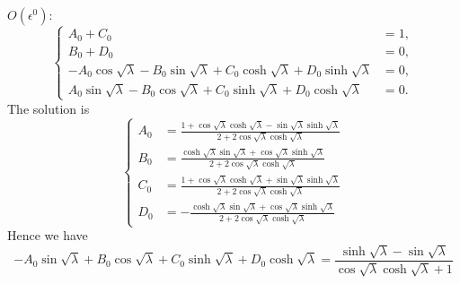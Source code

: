 \documentclass{article}
\begin{document}
\noindent
$O(\epsilon^0)$:
\begin{equation}
    \left\{\begin{aligned}
        A_0 + C_0 &= 1, \\
        B_0 + D_0 &= 0, \\
        - A_0 \cos{\sqrt{\lambda}} - B_0 \sin{\sqrt{\lambda}} + C_0 \cosh{\sqrt{\lambda}} + D_0 \sinh{\sqrt{\lambda}} &= 0, \\
        A_0 \sin{\sqrt{\lambda}} - B_0 \cos{\sqrt{\lambda}} + C_0 \sinh{\sqrt{\lambda}} + D_0 \cosh{\sqrt{\lambda}} &= 0.
    \end{aligned}\right.
\end{equation}
The solution is
\begin{equation}
    \left\{\begin{aligned}
        A_0 &= \frac{1 + \cos\sqrt{\lambda} \cosh\sqrt{\lambda} - \sin\sqrt{\lambda} \sinh\sqrt{\lambda} }{2 + 2 \cos\sqrt{\lambda} \cosh\sqrt{\lambda} } \\
        B_0 &= \frac{\cosh\sqrt{\lambda} \sin\sqrt{\lambda} + \cos\sqrt{\lambda} \sinh\sqrt{\lambda} }{2 + 2 \cos\sqrt{\lambda} \cosh\sqrt{\lambda} } \\
        C_0 &= \frac{1 + \cos\sqrt{\lambda} \cosh\sqrt{\lambda} + \sin\sqrt{\lambda} \sinh\sqrt{\lambda} }{2 + 2 \cos\sqrt{\lambda} \cosh\sqrt{\lambda} } \\
        D_0 &= -\frac{\cosh\sqrt{\lambda} \sin\sqrt{\lambda} + \cos\sqrt{\lambda} \sinh\sqrt{\lambda} }{2 + 2 \cos\sqrt{\lambda} \cosh\sqrt{\lambda} }
    \end{aligned}\right.
\end{equation}
Hence we have
\begin{equation}
    - A_0 \sin{\sqrt{\lambda}} + B_0 \cos{\sqrt{\lambda}} + C_0 \sinh{\sqrt{\lambda}} + D_0 \cosh{\sqrt{\lambda}} = \frac{\sinh\sqrt{\lambda }-\sin\sqrt{\lambda }}{\cos\sqrt{\lambda } \cosh\sqrt{\lambda }+1}
\end{equation}
\end{document}
